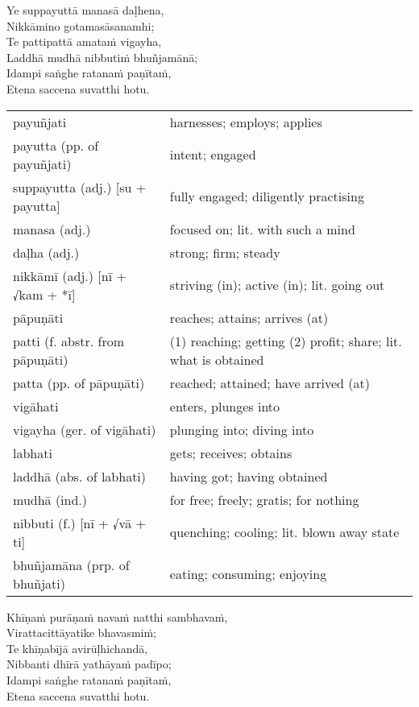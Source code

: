 \documentclass[11pt,oneside]{memoir}
\begin{document}
\clearpage

\begin{spacedquote}
Ye suppayuttā manasā daḷhena, \\[0pt]
Nikkāmino gotamasāsanamhi; \\[0pt]
Te pattipattā amataṁ vigayha, \\[0pt]
Laddhā mudhā nibbutiṁ bhuñjamānā; \\[0pt]
Idampi saṅghe ratanaṁ paṇītaṁ, \\[0pt]
Etena saccena suvatthi hotu.
\end{spacedquote}

\begin{longtable}{L{\colOne} L{\colTwo}}
payuñjati & harnesses; employs; applies\\[0pt]
payutta (pp. of payuñjati) & intent; engaged\\[0pt]
suppayutta (adj.) [su + payutta] & fully engaged; diligently practising\\[0pt]
manasa (adj.) & focused on; lit. with such a mind\\[0pt]
daḷha (adj.) & strong; firm; steady\\[0pt]
nikkāmī (adj.) [nī + √kam + *ī] & striving (in); active (in); lit. going out\\[0pt]
pāpuṇāti & reaches; attains; arrives (at)\\[0pt]
patti (f. abstr. from pāpuṇāti) & (1) reaching; getting (2) profit; share; lit. what is obtained\\[0pt]
patta (pp. of pāpuṇāti) & reached; attained; have arrived (at)\\[0pt]
vigāhati & enters, plunges into\\[0pt]
vigayha (ger. of vigāhati) & plunging into; diving into\\[0pt]
labhati & gets; receives; obtains\\[0pt]
laddhā (abs. of labhati) & having got; having obtained\\[0pt]
mudhā (ind.) & for free; freely; gratis; for nothing\\[0pt]
nibbuti (f.) [nī + √vā + ti] & quenching; cooling; lit. blown away state\\[0pt]
bhuñjamāna (prp. of bhuñjati) & eating; consuming; enjoying\\[0pt]
\end{longtable}

\clearpage

\begin{spacedquote}
Khīṇaṁ purāṇaṁ navaṁ natthi sambhavaṁ, \\[0pt]
Virattacittāyatike bhavasmiṁ; \\[0pt]
Te khīṇabījā avirūḷhichandā, \\[0pt]
Nibbanti dhīrā yathāyaṁ padīpo; \\[0pt]
Idampi saṅghe ratanaṁ paṇītaṁ, \\[0pt]
Etena saccena suvatthi hotu.
\end{spacedquote}
\end{document}
